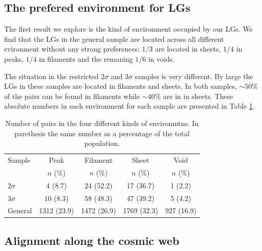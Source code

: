 \documentclass{emulateapj}
\begin{document}


\subsection{The prefered environment for LGs}

The first result we explore is the kind of environment occupied by
our LGs. We find that the LGs in the general sample are located across
all different evironment without any strong preferences; $1/3$  are
located in sheets, $1/4$ in peaks, $1/4$ in filaments and the remaning
$1/6$ in voids. 

The situation in the restricted $2\sigma$ and $3\sigma$ samples is very
different. By large the LGs in these samples are located in
filaments and sheets. In both samples, $\sim 50\%$ of the
pairs can be found in filaments while $\sim 40\%$ are in
in sheets. These absolute numbers in each environment for each sample
are presented in Table \ref{table:web_type}. 
 
\begin{table}
\begin{center}
\begin{tabular}{lcccc}\hline\hline
Sample & Peak & Filament & Sheet & Void\\
       & $n$ (\%) & $n$ (\%) & $n$ (\%) & $n$ (\%) \\\hline
2$\sigma$ & 4 (8.7) & 24 (52.2) &  17 (36.7) & 1 (2.2)\\
3$\sigma$ & 10 (8.3) & 58 (48.3) & 47 (39.2) & 5 (4.2)\\  
General & 1312 (23.9) & 1472 (26.9) & 1769 (32.3) & 927 (16.9)\\\hline
\end{tabular}
\caption{
Number of pairs in the four different kinds of environmtns. In
parethesis the same number as a percentage of the
total population. 
\label{table:web_type}}
\end{center}
\end{table}

\subsection{Alignment along the cosmic web}
\end{document}
